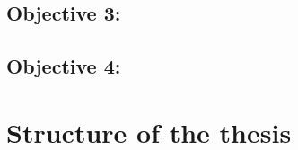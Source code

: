 \newcommand{\objectivetechniques}{To choose which Soft Computing and Machine Learning techniques suit best for every defined scenario.}

\subsection*{Objective 3: \objectiveframework}
\label{subsec:intro:obj:fwork}

\newcommand{\objectiveresearch}{} 

\subsection*{Objective 4: \objectiveresearch}
\label{subsec:intro:obj:applications}



\section{Structure of the thesis}
\label{sec:intro:structure}


